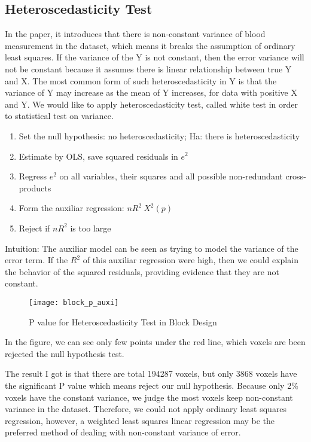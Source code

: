 \subsection{Heteroscedasticity Test}
In the paper, it introduces that there is non-constant variance of blood 
measurement in the dataset, which means it breaks the assumption of ordinary 
least squares. If the variance of the Y is not constant, then the error variance
will not be constant because it assumes there is linear relationship between 
true Y and X. The most common form of such heteroscedasticity in Y is that the 
variance of Y may increase as the mean of Y increases, for data with positive X
and Y. We would like to apply heteroscedasticity test, called white test in order to 
statistical test on variance.

\begin{enumerate}
\item Set the null hypothesis: no heteroscedasticity; Ha: there is heteroscedasticity
\item Estimate by OLS, save squared residuals in $e^2$
\item Regress $e^2$ on all variables, their squares and all possible non-redundant cross-products
\item Form the auxiliar regression: $n R^2 ~ X^2(p)$
\item Reject if $n R^2$ is too large
\end{enumerate}
Intuition: The auxiliar model can be seen as trying to model the variance of 
the error term. If the $R^2$ of this auxiliar regression were high, then we could
explain the behavior of the squared residuals, providing evidence that they are
not constant.

\begin{figure}[ht]
\centering
\texttt{[image: block\_p\_auxi]}
\caption{P value for Heteroscedasticity Test in Block Design}
\end{figure}

In the figure, we can see only few points under the red line, which voxels are
been rejected the null hypothesis test. 

The result I got is that there are total 194287 voxels, but only 3868 voxels 
have the significant P value which means reject our null hypothesis. Because 
only 2\% voxels have the constant variance, we judge the most voxels keep 
non-constant variance in the dataset. Therefore, we could not apply ordinary 
least squares regression, however, a weighted least squares linear regression 
may be the preferred method of dealing with non-constant variance of error.

